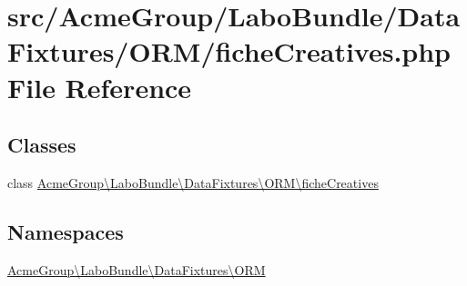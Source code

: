 \hypertarget{fiche_creatives_8php}{\section{src/\+Acme\+Group/\+Labo\+Bundle/\+Data\+Fixtures/\+O\+R\+M/fiche\+Creatives.php File Reference}
\label{fiche_creatives_8php}
}
\subsection*{Classes}
\begin{DoxyCompactItemize}
\item 
class \hyperlink{class_acme_group_1_1_labo_bundle_1_1_data_fixtures_1_1_o_r_m_1_1fiche_creatives}{Acme\+Group\textbackslash{}\+Labo\+Bundle\textbackslash{}\+Data\+Fixtures\textbackslash{}\+O\+R\+M\textbackslash{}fiche\+Creatives}
\end{DoxyCompactItemize}
\subsection*{Namespaces}
\begin{DoxyCompactItemize}
\item 
 \hyperlink{namespace_acme_group_1_1_labo_bundle_1_1_data_fixtures_1_1_o_r_m}{Acme\+Group\textbackslash{}\+Labo\+Bundle\textbackslash{}\+Data\+Fixtures\textbackslash{}\+O\+R\+M}
\end{DoxyCompactItemize}
